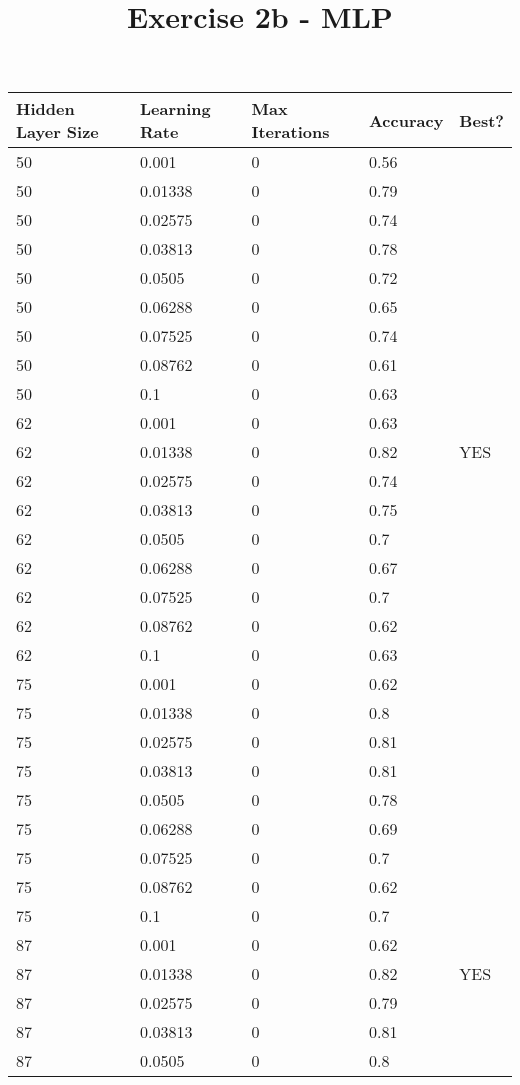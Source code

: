 \documentclass{article}%
\title{Exercise 2b {-} MLP}%
\date{}%
\begin{document}
%
\pagestyle{empty}%
\normalsize%
\maketitle%
\begin{longtable}{l l l l l}%
\hline%
Hidden Layer Size&Learning Rate&Max Iterations&Accuracy&Best?\\%
\hline%
\endhead%
\hline%
50&0.001&0&0.56&\\%
\hline%
50&0.01338&0&0.79&\\%
\hline%
50&0.02575&0&0.74&\\%
\hline%
50&0.03813&0&0.78&\\%
\hline%
50&0.0505&0&0.72&\\%
\hline%
50&0.06288&0&0.65&\\%
\hline%
50&0.07525&0&0.74&\\%
\hline%
50&0.08762&0&0.61&\\%
\hline%
50&0.1&0&0.63&\\%
\hline%
62&0.001&0&0.63&\\%
\hline%
62&0.01338&0&0.82&YES\\%
\hline%
62&0.02575&0&0.74&\\%
\hline%
62&0.03813&0&0.75&\\%
\hline%
62&0.0505&0&0.7&\\%
\hline%
62&0.06288&0&0.67&\\%
\hline%
62&0.07525&0&0.7&\\%
\hline%
62&0.08762&0&0.62&\\%
\hline%
62&0.1&0&0.63&\\%
\hline%
75&0.001&0&0.62&\\%
\hline%
75&0.01338&0&0.8&\\%
\hline%
75&0.02575&0&0.81&\\%
\hline%
75&0.03813&0&0.81&\\%
\hline%
75&0.0505&0&0.78&\\%
\hline%
75&0.06288&0&0.69&\\%
\hline%
75&0.07525&0&0.7&\\%
\hline%
75&0.08762&0&0.62&\\%
\hline%
75&0.1&0&0.7&\\%
\hline%
87&0.001&0&0.62&\\%
\hline%
87&0.01338&0&0.82&YES\\%
\hline%
87&0.02575&0&0.79&\\%
\hline%
87&0.03813&0&0.81&\\%
\hline%
87&0.0505&0&0.8&\\%

\end{longtable}
\end{document}
